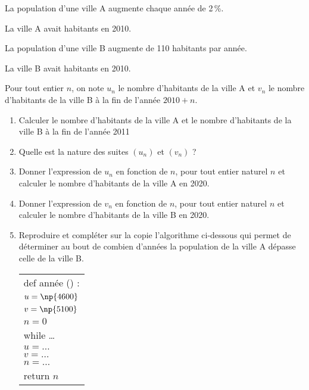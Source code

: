 
\medskip

La population d'une ville A augmente chaque année de 2\,\%. 

La ville A avait  habitants en 2010.

La population d'une ville B augmente de 110 habitants par année.

La ville B avait  habitants en 2010.

Pour tout entier $n$, on note $u_n$ le nombre d'habitants de la ville A et $v_n$ le nombre d'habitants de la ville B à la fin de l'année $2010 + n$.

\medskip

\begin{enumerate}
\item Calculer le nombre d'habitants de la ville A et le nombre d'habitants de la ville B à la fin de l'année 2011
\item Quelle est la nature des suites $\left(u_n\right)$ et $\left(v_n\right)$ ?
\item Donner l'expression de $u_n$ en fonction de $n$, pour tout entier naturel $n$ et calculer le nombre d'habitants de la ville A en 2020.
\item Donner l'expression de $v_n$ en fonction de $n$, pour tout entier naturel $n$ et calculer le nombre d'habitants de la ville B en 2020.
\item Reproduire et compléter sur la copie l'algorithme ci-dessous qui permet de déterminer au bout de combien d'années la population de la ville A dépasse celle de la ville B.

\begin{center}
\renewcommand{\arraystretch}{1.2}
\begin{tabular}{|l|}\hline
def année () : \hspace*{3cm}\\
\quad $u =\np{4600}$\\
\quad $v =\np{5100}$\\
\quad $n = 0$\\
\quad while \ldots\\
\qquad $u = \ldots$\\
\qquad $v = \ldots$\\
\qquad $n = \ldots$\\
\quad return $n$\\ \hline
\end{tabular}
\end{center}
\end{enumerate}

\bigskip

